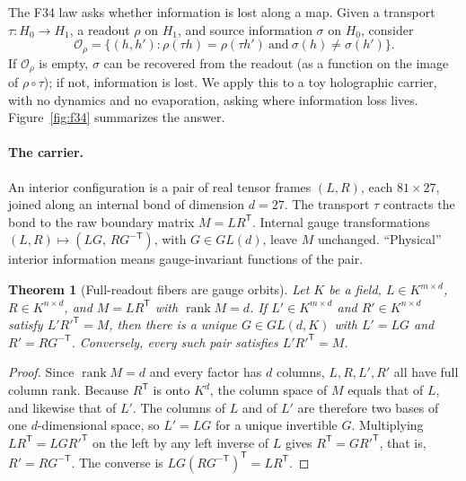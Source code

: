 \documentclass[11pt]{article}
\newtheorem{theorem}{Theorem}[section]
\theoremstyle{definition}
\begin{document}
The F34 law asks whether information is lost along a map. Given a transport \(\tau:H_0\to H_1\), a readout \(\rho\) on
\(H_1\), and source information \(\sigma\) on \(H_0\), consider
\[
\mathcal O_\rho=\{(h,h') : \rho(\tau h)=\rho(\tau h')\ \text{and}\ \sigma(h)\neq\sigma(h')\}.
\]
If \(\mathcal O_\rho\) is empty, \(\sigma\) can be recovered from the readout (as a function on the image of
\(\rho\circ\tau\)); if not, information is lost. We apply this to a toy holographic carrier, with no dynamics and no
evaporation, asking where information loss lives. Figure~\ref{fig:f34} summarizes the answer.

\paragraph{The carrier.} An interior configuration is a pair of real tensor frames \((L,R)\), each \(81\times27\),
joined along an internal bond of dimension \(d=27\). The transport \(\tau\) contracts the bond to the raw boundary
matrix \(M=LR^{\mathsf T}\). Internal gauge transformations \((L,R)\mapsto(LG,\,RG^{-\mathsf T})\), with \(G\in GL(d)\),
leave \(M\) unchanged. ``Physical'' interior information means gauge-invariant functions of the pair.

\begin{theorem}[Full-readout fibers are gauge orbits]\label{thm:f34}
Let \(K\) be a field, \(L\in K^{m\times d}\), \(R\in K^{n\times d}\), and \(M=LR^{\mathsf T}\) with
\(\operatorname{rank}M=d\). If \(L'\in K^{m\times d}\) and \(R'\in K^{n\times d}\) satisfy \(L'R'^{\mathsf T}=M\), then
there is a unique \(G\in GL(d,K)\) with \(L'=LG\) and \(R'=RG^{-\mathsf T}\). Conversely, every such pair satisfies
\(L'R'^{\mathsf T}=M\).
\end{theorem}

\begin{proof}
Since \(\operatorname{rank}M=d\) and every factor has \(d\) columns, \(L,R,L',R'\) all have full column rank. Because
\(R^{\mathsf T}\) is onto \(K^d\), the column space of \(M\) equals that of \(L\), and likewise that of \(L'\). The
columns of \(L\) and of \(L'\) are therefore two bases of one \(d\)-dimensional space, so \(L'=LG\) for a unique
invertible \(G\). Multiplying \(LR^{\mathsf T}=LGR'^{\mathsf T}\) on the left by any left inverse of \(L\) gives
\(R^{\mathsf T}=GR'^{\mathsf T}\), that is, \(R'=RG^{-\mathsf T}\). The converse is
\(LG(RG^{-\mathsf T})^{\mathsf T}=LR^{\mathsf T}\).
\end{proof}
\end{document}
